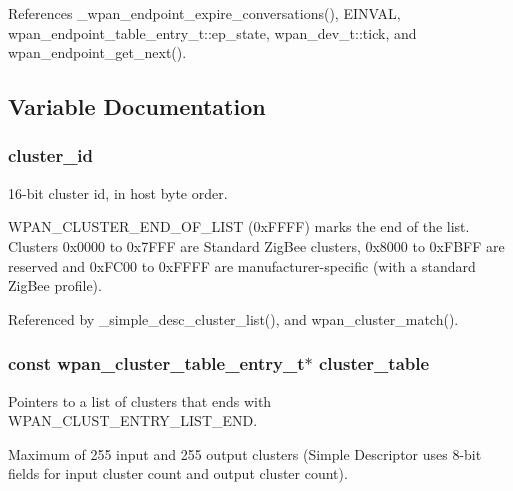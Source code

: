 References \-\_\-wpan\-\_\-endpoint\-\_\-expire\-\_\-conversations(), E\-I\-N\-V\-A\-L, wpan\-\_\-endpoint\-\_\-table\-\_\-entry\-\_\-t\-::ep\-\_\-state, wpan\-\_\-dev\-\_\-t\-::tick, and wpan\-\_\-endpoint\-\_\-get\-\_\-next().



\subsection{Variable Documentation}
\hypertarget{group__wpan__aps_ga262a92f94287e77cb56350951893bae2}{
\subsubsection[{cluster\-\_\-id}]{ cluster\-\_\-id}}\label{group__wpan__aps_ga262a92f94287e77cb56350951893bae2}


16-\/bit cluster id, in host byte order. 

W\-P\-A\-N\-\_\-\-C\-L\-U\-S\-T\-E\-R\-\_\-\-E\-N\-D\-\_\-\-O\-F\-\_\-\-L\-I\-S\-T (0x\-F\-F\-F\-F) marks the end of the list. Clusters 0x0000 to 0x7\-F\-F\-F are Standard Zig\-Bee clusters, 0x8000 to 0x\-F\-B\-F\-F are reserved and 0x\-F\-C00 to 0x\-F\-F\-F\-F are manufacturer-\/specific (with a standard Zig\-Bee profile). 

Referenced by \-\_\-simple\-\_\-desc\-\_\-cluster\-\_\-list(), and wpan\-\_\-cluster\-\_\-match().

\hypertarget{group__wpan__aps_gac7944498524739a9becec626bf9bcb15}{
\subsubsection[{cluster\-\_\-table}]{\setlength{\rightskip}{0pt plus 5cm}const {\bf wpan\-\_\-cluster\-\_\-table\-\_\-entry\-\_\-t}$\ast$ cluster\-\_\-table}}\label{group__wpan__aps_gac7944498524739a9becec626bf9bcb15}


Pointers to a list of clusters that ends with W\-P\-A\-N\-\_\-\-C\-L\-U\-S\-T\-\_\-\-E\-N\-T\-R\-Y\-\_\-\-L\-I\-S\-T\-\_\-\-E\-N\-D. 

Maximum of 255 input and 255 output clusters (Simple Descriptor uses 8-\/bit fields for input cluster count and output cluster count). 


